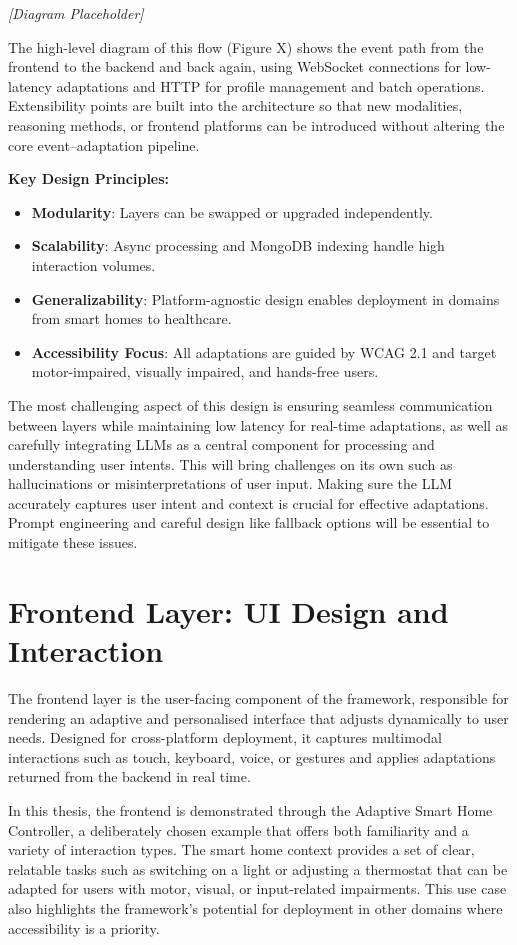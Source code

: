 \documentclass[openany]{book}
\begin{document}
\emph{[Diagram Placeholder]}

The high-level diagram of this flow (Figure X) shows the event path from the frontend to the backend and back again, using WebSocket connections for low-latency adaptations and HTTP for profile management and batch operations. Extensibility points are built into the architecture so that new modalities, reasoning methods, or frontend platforms can be introduced without altering the core event–adaptation pipeline.

\textbf{Key Design Principles:}
\begin{itemize}
\item \textbf{Modularity}: Layers can be swapped or upgraded independently.
\item \textbf{Scalability}: Async processing and MongoDB indexing handle high interaction volumes.
\item \textbf{Generalizability}: Platform-agnostic design enables deployment in domains from smart homes to healthcare.
\item \textbf{Accessibility Focus}: All adaptations are guided by WCAG 2.1 and target motor-impaired, visually impaired, and hands-free users.
\end{itemize}

The most challenging aspect of this design is ensuring seamless communication between layers while maintaining low latency for real-time adaptations, as well as carefully integrating LLMs as a central component for processing and understanding user intents. This will bring challenges on its own such as hallucinations or misinterpretations of user input. Making sure the LLM accurately captures user intent and context is crucial for effective adaptations. Prompt engineering and careful design like fallback options will be essential to mitigate these issues.

\section{Frontend Layer: UI Design and Interaction}
The frontend layer is the user-facing component of the framework, responsible for rendering an adaptive and personalised interface that adjusts dynamically to user needs. Designed for cross-platform deployment, it captures multimodal interactions such as touch, keyboard, voice, or gestures and applies adaptations returned from the backend in real time.

In this thesis, the frontend is demonstrated through the Adaptive Smart Home Controller, a deliberately chosen example that offers both familiarity and a variety of interaction types. The smart home context provides a set of clear, relatable tasks such as switching on a light or adjusting a thermostat that can be adapted for users with motor, visual, or input-related impairments. This use case also highlights the framework’s potential for deployment in other domains where accessibility is a priority.
\end{document}
